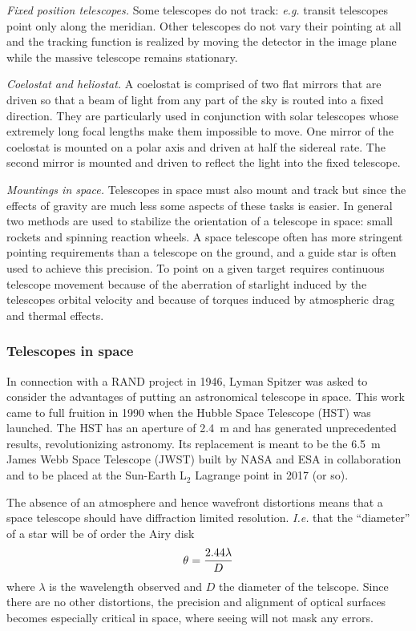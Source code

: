 \documentclass{article}
\begin{document}
\noindent
{\it Fixed position telescopes.} Some telescopes do not track: {\it e.g.} transit telescopes
point only along the meridian. Other telescopes do not vary their pointing at all and
the tracking function is realized by moving the detector in the image plane while the 
massive telescope remains stationary.

\noindent
{\it Coelostat and heliostat.} A coelostat is comprised of two flat mirrors that are driven 
so that a beam of light from any part of the sky is routed into a fixed direction. They are
particularly used in conjunction with solar telescopes whose extremely long focal lengths
make them impossible to move. One mirror of the coelostat is mounted on a polar axis and
driven at half the sidereal rate. The second mirror is mounted and driven to reflect the light
into the fixed telescope.

\noindent
{\it Mountings in space.} Telescopes in space must also mount and track but since the 
effects of gravity are much less some aspects of these tasks is easier. In general two methods
are used to stabilize the orientation of a telescope in space: small rockets and spinning 
reaction wheels. A space telescope often has more stringent pointing requirements than
a telescope on the ground, and a guide star is often used to achieve this precision. To point
on a given target requires continuous telescope movement because of the aberration of 
starlight induced by the telescopes orbital velocity and because of torques induced by 
atmospheric drag and thermal effects. 

\subsubsection{Telescopes in space}

In connection with a RAND project in 1946, Lyman Spitzer was asked to consider the advantages
of putting an astronomical telescope in space. This work came to full fruition in 1990 
when the Hubble Space Telescope (HST) was launched. The HST has an aperture of 2.4~m and
has generated unprecedented results, revolutionizing astronomy. Its replacement is meant to
be the 6.5~m James Webb Space Telescope (JWST) built by NASA and ESA in collaboration and to
be placed at the Sun-Earth L$_2$ Lagrange point in 2017 (or so).

The absence of an atmosphere and hence wavefront distortions means that a space telescope 
should have diffraction limited resolution. {\it I.e.} that the ``diameter'' of a star will
be of order the Airy disk
\[
\theta={2.44\lambda\over D}
\]
where $\lambda$ is the wavelength observed and $D$ the diameter of the telscope. Since there
are no other distortions, the precision and alignment of optical surfaces becomes especially 
critical in space, where seeing will not mask any errors.
\end{document}
